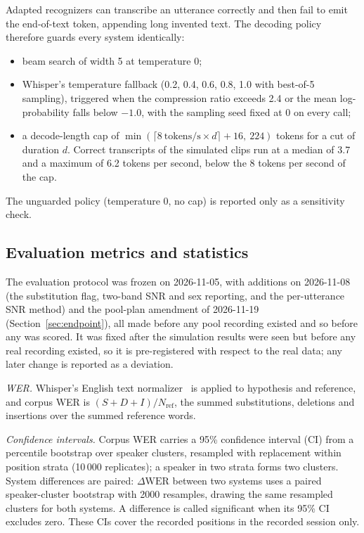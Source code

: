 \documentclass[conference]{IEEEtran}
\begin{document}
Adapted recognizers can transcribe an utterance correctly and then fail to emit the end-of-text token,
appending long invented text. The decoding policy therefore guards every system identically:
\begin{itemize}
\item beam search of width 5 at temperature 0;
\item Whisper's temperature fallback (0.2, 0.4, 0.6, 0.8, 1.0 with best-of-5 sampling), triggered when
the compression ratio exceeds 2.4 or the mean log-probability falls below $-1.0$, with the sampling
seed fixed at 0 on every call;
\item a decode-length cap of $\min(\lceil 8~\mathrm{tokens/s} \times d\rceil + 16,\ 224)$ tokens for a
cut of duration $d$. Correct transcripts of the simulated clips run at a median of 3.7 and a maximum of
6.2 tokens per second, below the 8 tokens per second of the cap.
\end{itemize}
The unguarded policy (temperature 0, no cap) is reported only as a sensitivity check.

\subsection{Evaluation metrics and statistics}
\label{sec:stats}
The evaluation protocol was frozen on 2026-11-05, with additions on 2026-11-08 (the substitution
flag, two-band SNR and sex reporting, and the per-utterance SNR method) and the pool-plan amendment
of 2026-11-19 (Section~\ref{sec:endpoint}), all made before any pool recording existed and so before any
was scored. It was fixed after the simulation results were seen but before any real recording existed,
so it is pre-registered with respect to the real data; any later change is reported as a deviation.

\textit{WER.} Whisper's English text normalizer~\cite{radford2023} is applied to hypothesis and
reference, and corpus WER is $(S+D+I)/N_{\mathrm{ref}}$, the summed substitutions, deletions and
insertions over the summed reference words.

\textit{Confidence intervals.} Corpus WER carries a 95\% confidence interval (CI) from a percentile
bootstrap over speaker clusters, resampled with replacement within position strata
(10\,000 replicates); a speaker in two strata forms two clusters. System differences are paired:
$\Delta\mathrm{WER}$ between two systems uses a paired speaker-cluster bootstrap with 2000 resamples,
drawing the same resampled clusters for both systems. A difference is called significant when its 95\%
CI excludes zero.
These CIs cover the recorded positions in the recorded session only.
\end{document}
